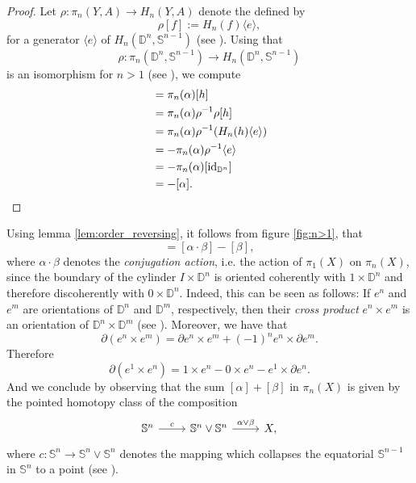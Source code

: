 \begin{proof}
 	Let $\rho : \pi_n(Y,A) \to H_n(Y,A)$ denote the  defined by
	\begin{equation*}
		\rho[f] := H_n(f)\langle e \rangle,
	\end{equation*}
	\noindent for a generator $\langle e \rangle$ of $H_n(\mathbb{D}^n,\mathbb{S}^{n - 1})$ (see \cite[166]{whitehead:homotopy_theory:1978}). Using that 
	\begin{equation*}
		\rho : \pi_n(\mathbb{D}^n,\mathbb{S}^{n - 1}) \to H_n(\mathbb{D}^n,\mathbb{S}^{n - 1})
	\end{equation*}
	\noindent is an isomorphism for $n >1$ (see \cite[168]{whitehead:homotopy_theory:1978}), we compute
	\begin{align*}
		[\alpha \circ h] &= \pi_n(\alpha)[h]\\
		&= \pi_n(\alpha)\rho^{-1}\rho[h]\\ 
		&= \pi_n(\alpha)\rho^{-1}(H_n(h)\langle e \rangle)\\
		&= -\pi_n(\alpha)\rho^{-1}\langle e \rangle\\
		&= -\pi_n(\alpha)[\id_{\mathbb{D}^n}]\\
		&= - [\alpha].
	\end{align*}
\end{proof}

Using lemma \ref{lem:order_reversing}, it follows from figure \ref{fig:n>1}, that
\begin{equation*}
	[\alpha,\beta] = [\alpha \cdot \beta] - [\beta],
\end{equation*}
\noindent where $\alpha \cdot \beta$ denotes the \emph{conjugation action}, i.e. the action of $\pi_1(X)$ on $\pi_n(X)$, since the boundary of the cylinder $I \times \mathbb{D}^n$ is oriented coherently with $1 \times \mathbb{D}^n$ and therefore discoherently with $0 \times \mathbb{D}^n$. Indeed, this can be seen as follows: If $e^n$ and $e^m$ are orientations of $\mathbb{D}^n$ and $\mathbb{D}^m$, respectively, then their \emph{cross product} $e^n \times e^m$ is an orientation of $\mathbb{D}^n \times \mathbb{D}^m$ (see \cite[64]{whitehead:homotopy_theory:1978}). Moreover, we have that 
\begin{equation*}
	\partial(e^n \times e^m) = \partial e^n \times e^m + (-1)^n e^n \times \partial e^m.
\end{equation*}
Therefore
\begin{equation*}
	\partial(e^1 \times e^n) = 1 \times e^n - 0 \times e^n - e^1 \times \partial e^n.
\end{equation*}
And we conclude by observing that the sum $[\alpha] + [\beta]$ in $\pi_n(X)$ is given by the pointed homotopy class of the composition
\begin{equation*}
	\begin{tikzcd}
		\mathbb{S}^n \arrow[r,"c"] & \mathbb{S}^n \vee \mathbb{S}^n \arrow[r,"\alpha \vee \beta"] & X,
	\end{tikzcd}
\end{equation*}
\noindent where $c : \mathbb{S}^n \to \mathbb{S}^n \vee \mathbb{S}^n$ denotes the mapping which collapses the equatorial $\mathbb{S}^{n - 1}$ in $\mathbb{S}^n$ to a point (see \cite[341]{hatcher:algebraic_topology:2001}).

